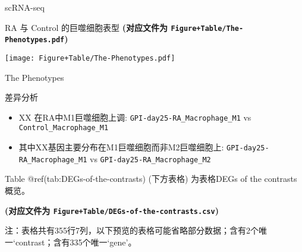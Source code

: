 \documentclass[
  ignorenonframetext,
]{beamer}
\providecommand{\tightlist}{%
  \setlength{\itemsep}{0pt}\setlength{\parskip}{0pt}}
\begin{document}
\begin{frame}[fragile]{scRNA-seq}
\begin{block}{RA 与 Control 的巨噬细胞表型}
\textbf{(对应文件为 \texttt{Figure+Table/The-Phenotypes.pdf})}

\def\@captype{figure}
\begin{center}
\texttt{[image: Figure+Table/The-Phenotypes.pdf]}
\caption{The Phenotypes}\label{fig:The-Phenotypes}
\end{center}
\end{block}

\begin{block}{差异分析}
\protect\hypertarget{ux5deeux5f02ux5206ux6790}{}
\begin{itemize}
\tightlist
\item
  XX 在RA中M1巨噬细胞上调: \texttt{GPI-day25-RA\_Macrophage\_M1} vs
  \texttt{Control\_Macrophage\_M1}
\item
  其中XX基因主要分布在M1巨噬细胞而非M2巨噬细胞上:
  \texttt{GPI-day25-RA\_Macrophage\_M1} vs
  \texttt{GPI-day25-RA\_Macrophage\_M2}
\end{itemize}

Table @ref(tab:DEGs-of-the-contrasts) (下方表格) 为表格DEGs of the
contrasts概览。

\textbf{(对应文件为 \texttt{Figure+Table/DEGs-of-the-contrasts.csv})}

\begin{center}\begin{tcolorbox}[colback=gray!10, colframe=gray!50, width=0.9\linewidth, arc=1mm, boxrule=0.5pt]注：表格共有355行7列，以下预览的表格可能省略部分数据；含有2个唯一`contrast；含有335个唯一`gene'。
\end{tcolorbox}
\end{center}


\end{block}
\end{frame}
\end{document}
